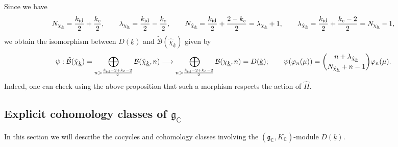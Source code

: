 \documentclass{amsart}
\theoremstyle{definition}
\theoremstyle{remark}
\numberwithin{equation}{section}
\newcommand{\C}{{\mathbb C}}
\newcommand{\cB}{{\mathcal B}}
\newcommand{\mfg}{{\mathfrak g}}
\begin{document}
Since we have
\[
N_{\chi_{\underline k}}=\frac{k_{\rm id}}{2}+\frac{k_c}{2},\qquad \lambda_{\chi_{\underline k}}=\frac{k_{\rm id}}{2}-\frac{k_c}{2},\qquad N_{\hat\chi_{\underline k}}=\frac{k_{\rm id}}{2}+\frac{2-k_c}{2}=\lambda_{\chi_{\underline k}}+1,\qquad \lambda_{\hat\chi_{\underline k}}=\frac{k_{\rm id}}{2}+\frac{k_c-2}{2}=N_{\chi_{\underline k}}-1,
\]
we obtain the isomorphism between $D(\underline k)$ and $\tilde \cB(\hat\chi_{\underline k})$ given by
\begin{equation}\label{isoBD}
\psi:\tilde \cB(\hat\chi_{\underline k})=\bigoplus_{n> \frac{k_{\rm id}-2+k_{c}-2}{2}}\cB(\hat\chi_{\underline{k}},n)\longrightarrow \bigoplus_{n> \frac{k_{\rm id}-2+k_{c}-2}{2}}\cB(\chi_{\underline{k}},n)= D(\underline k);\qquad \psi(\varphi_n(\mu))=\binom{n+\lambda_{\hat\chi_{\underline{k}}}}{N_{\hat\chi_{\underline{k}}}+n-1}\varphi_n(\mu).
\end{equation}
Indeed, one can check using the above proposition that such a morphism respects the action of $\hat H$.

\subsection{Explicit cohomology classes of $\mfg_\C$}\label{ExplCCC}

In this section we will describe the cocycles and cohomology classes involving the $(\mfg_\C,K_\C)$-module $D(\underline{k})$.  
\end{document}
